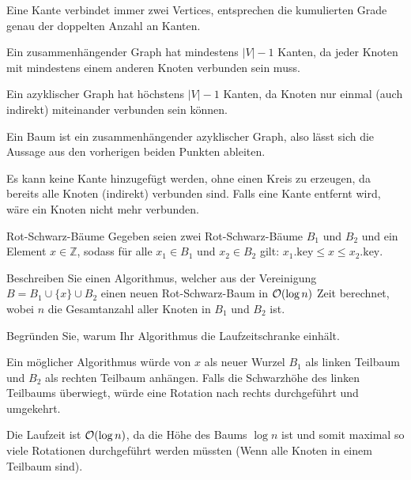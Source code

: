 \documentclass{article}
\begin{document}
\begin{solutions}
  \item Eine Kante verbindet immer zwei Vertices, entsprechen die kumulierten Grade genau der doppelten Anzahl an Kanten.
  \item Ein zusammenhängender Graph hat mindestens $|V| - 1$ Kanten, da jeder Knoten mit mindestens einem anderen Knoten verbunden sein muss.
  \item Ein azyklischer Graph hat höchstens $|V| - 1$ Kanten, da Knoten nur einmal (auch indirekt) miteinander verbunden sein können.
  \item Ein Baum ist ein zusammenhängender azyklischer Graph, also lässt sich die Aussage aus den vorherigen beiden Punkten ableiten.
  \item Es kann keine Kante hinzugefügt werden, ohne einen Kreis zu erzeugen, da bereits alle Knoten (indirekt) verbunden sind. Falls eine Kante entfernt wird, wäre ein Knoten nicht mehr verbunden.
\end{solutions}

\begin{eexercises}{Rot-Schwarz-Bäume}{
    Gegeben seien zwei Rot-Schwarz-Bäume $B_1$ und $B_2$ und ein Element $x \in \mathbb{Z}$, sodass für alle $x_1 \in B_1$ und $x_2 \in B_2$ gilt: $x_1.\text{key} \leq x \leq x_2.\text{key}$.
  }
  \item Beschreiben Sie einen Algorithmus, welcher aus der Vereinigung $B = B_1 \cup \{x\} \cup B_2$ einen neuen Rot-Schwarz-Baum in $\mathcal{O}(\log n)$ Zeit berechnet, wobei $n$ die Gesamtanzahl aller Knoten in $B_1$ und $B_2$ ist.
  \item Begründen Sie, warum Ihr Algorithmus die Laufzeitschranke einhält.
\end{eexercises}

\begin{solutions}
  \item Ein möglicher Algorithmus würde von $x$ als neuer Wurzel $B_1$ als linken Teilbaum und $B_2$ als rechten Teilbaum anhängen. Falls die Schwarzhöhe des linken Teilbaums überwiegt, würde eine Rotation nach rechts durchgeführt und umgekehrt.
  \item Die Laufzeit ist $\mathcal{O}(\log n)$, da die Höhe des Baums $\log n$ ist und somit maximal so viele Rotationen durchgeführt werden müssten (Wenn alle Knoten in einem Teilbaum sind).
\end{solutions}
\end{document}
